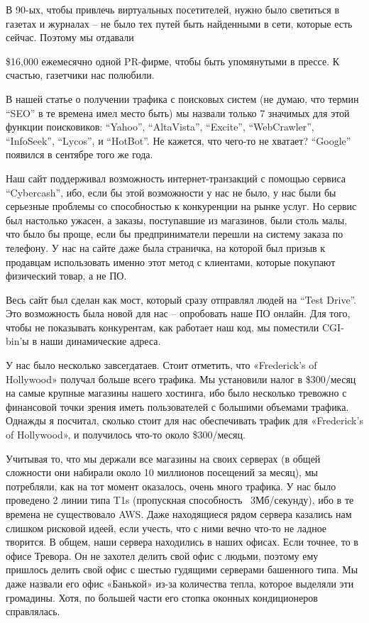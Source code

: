 \documentclass[ebook,12pt,oneside,openany]{memoir}
\begin{document}
В 90-ых, чтобы привлечь виртуальных посетителей, нужно было светиться
в газетах и журналах – не было тех путей быть найденными в сети,
которые есть сейчас. Поэтому мы отдавали \newline

\$16,000 ежемесячно одной PR-фирме, чтобы быть упомянутыми в прессе. К
счастью, газетчики нас полюбили. \newline

В нашей статье о получении трафика с поисковых систем (не думаю, что
термин “SEO” в те времена имел место быть) мы назвали только 7
значимых для этой функции поисковиков: “Yahoo”, “AltaVista”, “Excite”,
“WebCrawler”, “InfoSeek”, “Lycos”, и “HotBot”. Не кажется, что чего-то
не хватает? “Google” появился в сентябре того же года. \newline

Наш сайт поддерживал возможность интернет-транзакций с помощью сервиса
“Cybercash”, ибо, если бы этой возможности у нас не было, у нас были
бы серьезные проблемы со способностью к конкуренции на рынке услуг. Но
сервис был настолько ужасен, а заказы, поступавшие из магазинов, были
столь малы, что было бы проще, если бы предприниматели перешли на
систему заказа по телефону. У нас на сайте даже была страничка, на
которой был призыв к продавцам использовать именно этот метод с
клиентами, которые покупают физический товар, а не ПО. \newline

Весь сайт был сделан как мост, который сразу отправлял людей на “Test
Drive”. Это возможность была новой для нас – опробовать наше ПО
онлайн. Для того, чтобы не показывать конкурентам, как работает наш
код, мы поместили CGI-bin’ы в наши динамические адреса. \newline

У нас было несколько завсегдатаев. Стоит отметить, что «Frederick's of
Hollywood» получал больше всего трафика. Мы установили налог в
\$300/месяц на самые крупные магазины нашего хостинга, ибо было
несколько тревожно с финансовой точки зрения иметь пользователей с
большими объемами трафика. Однажды я посчитал, сколько стоит для нас
обеспечивать трафик для «Frederick's of Hollywood», и получилось
что-то около \$300/месяц. \newline

Учитывая то, что мы держали все магазины на своих серверах (в общей
сложности они набирали около 10 миллионов посещений за месяц), мы
потребляли, как на тот момент оказалось, очень много трафика. У нас
было проведено 2 линии типа T1s (пропускная способность ~3Мб/секунду),
ибо в те времена не существовало AWS. Даже находящиеся рядом сервера
казались нам слишком рисковой идеей, если учесть, что с ними вечно
что-то не ладное творится. В общем, наши сервера находились в наших
офисах. Если точнее, то в офисе Тревора. Он не захотел делить свой
офис с людьми, поэтому ему пришлось делить свой офис с шестью гудящими
серверами башенного типа. Мы даже назвали его офис «Банькой» из-за
количества тепла, которое выделяли эти громадины. Хотя, по большей
части его стопка оконных кондиционеров справлялась. \newline
\end{document}
